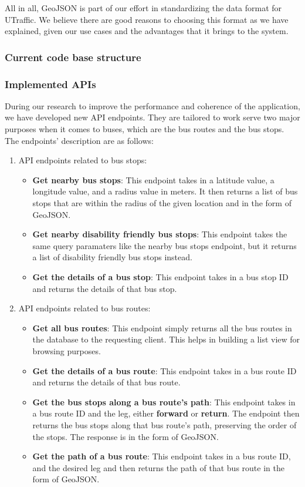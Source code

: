 All in all, GeoJSON is part of our effort in standardizing the data format for UTraffic. We believe there are good reasons to choosing this format as we have explained, given our use cases and the advantages that it brings to the system.

\subsubsection{Current code base structure}

\subsubsection{Implemented APIs}

During our research to improve the performance and coherence of the application, we have developed new API endpoints. They are tailored to work serve two major purposes when it comes to buses, which are the bus routes and the bus stops. The endpoints' description are as follows:
\begin{enumerate}
    \item API endpoints related to bus stops:
    \begin{itemize}
        \item \textbf{Get nearby bus stops}: This endpoint takes in a latitude value, a longitude value, and a radius value in meters. It then returns a list of bus stops that are within the radius of the given location and in the form of GeoJSON.
        \item \textbf{Get nearby disability friendly bus stops}: This endpoint takes the same query paramaters like the nearby bus stops endpoint, but it returns a list of disability friendly bus stops instead.
        \item \textbf{Get the details of a bus stop}: This endpoint takes in a bus stop ID and returns the details of that bus stop.
    \end{itemize}
    \item API endpoints related to bus routes:
    \begin{itemize}
        \item \textbf{Get all bus routes}: This endpoint simply returns all the bus routes in the database to the requesting client. This helps in building a list view for browsing purposes.
        \item \textbf{Get the details of a bus route}: This endpoint takes in a bus route ID and returns the details of that bus route.
        \item \textbf{Get the bus stops along a bus route's path}: This endpoint takes in a bus route ID and the leg, either \textbf{forward} or \textbf{return}. The endpoint then returns the bus stops along that bus route's path, preserving the order of the stops. The response is in the form of GeoJSON.
        \item \textbf{Get the path of a bus route}: This endpoint takes in a bus route ID, and the desired leg and then returns the path of that bus route in the form of GeoJSON.
    \end{itemize}
\end{enumerate}

